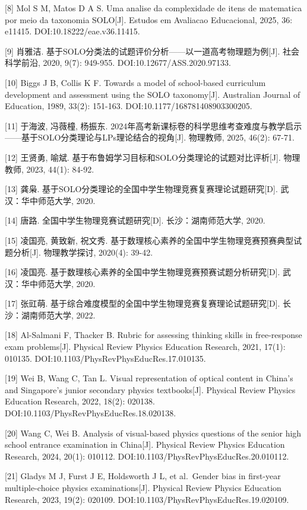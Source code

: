 \documentclass[
  12pt,
  a4paper,twoside,openany]{ctexbook}
\begin{document}
{[}8{]} Mol S M, Matos D A S. Uma analise da complexidade de itens de
matematica por meio da taxonomia SOLO{[}J{]}. Estudos em Avaliacao
Educacional, 2025, 36: e11415. DOI:10.18222/eae.v36.11415.

{[}9{]} 肖雅洁.
基于SOLO分类法的试题评价分析------以一道高考物理题为例{[}J{]}.
社会科学前沿, 2020, 9(7): 949-955. DOI:10.12677/ASS.2020.97133.

{[}10{]} Biggs J B, Collis K F. Towards a model of school-based
curriculum development and assessment using the SOLO taxonomy{[}J{]}.
Australian Journal of Education, 1989, 33(2): 151-163.
DOI:10.1177/168781408903300205.

{[}11{]} 于海波, 冯薇橦, 杨振东.
2024年高考新课标卷的科学思维考查难度与教学启示------基于SOLO分类理论与LPs理论结合的视角{[}J{]}.
物理教师, 2025, 46(2): 67-71.

{[}12{]} 王贤勇, 喻斌.
基于布鲁姆学习目标和SOLO分类理论的试题对比评析{[}J{]}. 物理教师, 2023,
44(1): 84-92.

{[}13{]} 龚枭.
基于SOLO分类理论的全国中学生物理竞赛复赛理论试题研究{[}D{]}.
武汉：华中师范大学, 2020.

{[}14{]} 唐路. 全国中学生物理竞赛试题研究{[}D{]}. 长沙：湖南师范大学, 2020.

{[}15{]} 凌国亮, 黄致新, 祝文秀.
基于数理核心素养的全国中学生物理竞赛预赛典型试题分析{[}J{]}.
物理教学探讨, 2020(4): 39-42.

{[}16{]} 凌国亮.
基于数理核心素养的全国中学生物理竞赛预赛试题分析研究{[}D{]}.
武汉：华中师范大学, 2020.

{[}17{]} 张豇萌.
基于综合难度模型的全国中学生物理竞赛复赛理论试题研究{[}D{]}.
长沙：湖南师范大学, 2022.

{[}18{]} Al-Salmani F, Thacker B. Rubric for assessing thinking skills
in free-response exam problems{[}J{]}. Physical Review Physics Education
Research, 2021, 17(1): 010135. DOI:10.1103/PhysRevPhysEducRes.17.010135.

{[}19{]} Wei B, Wang C, Tan L. Visual representation of optical content
in China's and Singapore's junior secondary physics textbooks{[}J{]}.
Physical Review Physics Education Research, 2022, 18(2): 020138.
DOI:10.1103/PhysRevPhysEducRes.18.020138.

{[}20{]} Wang C, Wei B. Analysis of visual-based physics questions of
the senior high school entrance examination in China{[}J{]}. Physical
Review Physics Education Research, 2024, 20(1): 010112.
DOI:10.1103/PhysRevPhysEducRes.20.010112.

{[}21{]} Gladys M J, Furst J E, Holdsworth J L, et al.~Gender bias in
first-year multiple-choice physics examinations{[}J{]}. Physical Review
Physics Education Research, 2023, 19(2): 020109.
DOI:10.1103/PhysRevPhysEducRes.19.020109.
\end{document}
